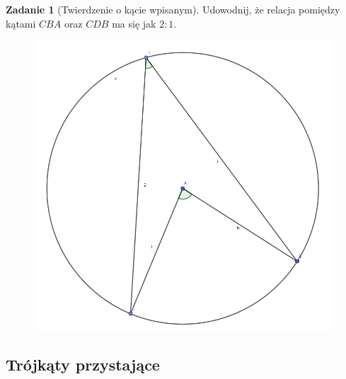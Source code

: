 \documentclass[11pt]{article}
\theoremstyle{definition}
\newtheorem{zad}{Zadanie}
\numberwithin{zad}{section}
\begin{document}
\begin{zad}[Twierdzenie o kącie wpisanym] Udowodnij, że relacja pomiędzy kątami $CBA$ oraz $CDB$ ma się jak $2:1$.
\begin{figure}[h]
\centering
\includegraphics[width=0.5\linewidth]{circle.png}
\end{figure}
\end{zad}


\subsection{Trójkąty przystające}

%
%
%
\end{document}
